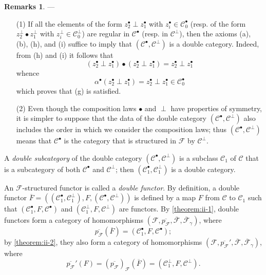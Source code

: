 \documentclass[a4paper,fleqn]{article}
\theoremstyle{plain}
\theoremstyle{definition}
\newtheorem*{remarks}{Remarks}
\newcommand{\oldpage}[1]{{\marginpar{\footnotesize$\bigg\vert$\,\,\,\,\textit{p.~#1}}}}
\newcommand{\CC}{\mathcal{C}}
\newcommand{\FF}{\mathcal{F}}
\begin{document}
\begin{remarks}
  ---
  \begin{enumerate}
    \item[\normalfont(1)]
      If all the elements of the form $z_2^\bullet\perp z_1^\bullet$ with $z_i^\bullet\in\CC_0^\bullet$ (resp. of the form $z_2^\perp\bullet z_1^\perp$ with $z_i^\perp\in\CC_0^\perp$) are regular \cite{3a} in $\CC^\bullet$ (resp. in $\CC^\perp$), then the axioms (a), (b), (h), and (i) suffice to imply that $(\CC^\bullet,\CC^\perp)$ is a double category.
      Indeed, from (h) and (i) it follows that
      \[
        (z_2^\bullet\perp z_1^\bullet)\bullet(z_2^\bullet\perp z_1^\bullet)
        = z_2^\bullet\perp z_1^\bullet
      \]
      whence
      \[
        \alpha^\bullet(z_2^\bullet\perp z_1^\bullet)
        = z_2^\bullet\perp z_1^\bullet
        \in\CC_0^\bullet
      \]
      which proves that (g) is satisfied.

    \item[\normalfont(2)]
      \oldpage{393}
      Even though the composition laws $\bullet$ and $\perp$ have properties of symmetry, it is simpler to suppose that the data of the double category $(\CC^\bullet,\CC^\perp)$ also includes the order in which we consider the composition laws;
      thus $(\CC^\bullet,\CC^\perp)$ means that $\CC^\bullet$ is the category that is structured in $\FF$ by $\CC^\perp$.
  \end{enumerate}
\end{remarks}

A \emph{double subcategory} of the double category $(\CC^\bullet,\CC^\perp)$ is a subclass $\CC_1$ of $\CC$ that is a subcategory of both $\CC^\bullet$ and $\CC^\perp$;
then $(\CC_1^\bullet,\CC_1^\perp)$ is a double category.

An $\FF$-structured functor is called a \emph{double functor}.
By definition, a double functor $\overline{F}=((\CC_1^\bullet,\CC_1^\perp),F,(\CC^\bullet,\CC^\perp))$ is defined by a map $F$ from $\CC$ to $\CC_1$ such that $(\CC_1^\bullet,F,\CC^\bullet)$ and $(\CC_1^\perp,F,\CC^\perp)$ are functors.
By \cref{theorem:ii-1}, double functors form a category of homomorphisms $(\FF,\overline{p_\FF},\overline{\FF},\overline{\FF}_\gamma)$, where
\[
  \overline{p_\FF}(\overline{F})
  = (\CC_1^\bullet,F,\CC^\bullet);
\]
by \cref{theorem:ii-2}, they also form a category of homomorphisms $(\FF,\overline{p_\FF}',\overline{\FF},\overline{\FF}_\gamma)$, where
\[
  \overline{p_\FF}'(F)
  = (\overline{p_\FF})_\FF(\overline{F})
  = (\CC_1^\perp,F,\CC^\perp).
\]
\end{document}

